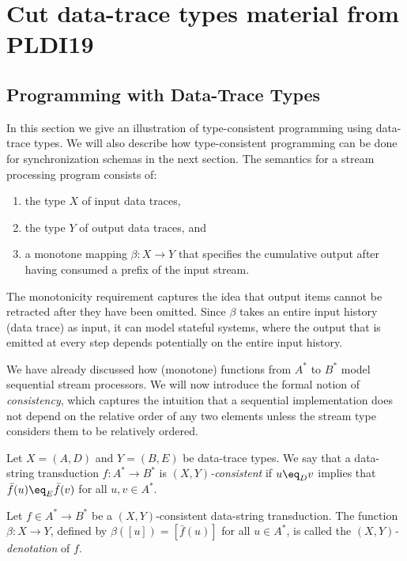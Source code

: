 \chapter{Cut data-trace types material from PLDI19}

\section{Programming with Data-Trace Types}
\label{subsec:dtt-2}

In this section we give an illustration of type-consistent programming
using data-trace types.
We will also describe how type-consistent programming can be done for
synchronization schemas in the next section.
The semantics for a stream processing program consists of:
\begin{enumerate}
\item
the type $X$ of input data traces,
\item
the type $Y$ of output data traces, and
\item
a monotone mapping $\beta: X \to Y$ that specifies the cumulative output after having consumed a prefix of the input stream.
\end{enumerate}
The monotonicity requirement captures the idea that output items cannot be retracted after they have been omitted. Since $\beta$ takes an entire input history (data trace) as input, it can model stateful systems, where the output that is emitted at every step depends potentially on the entire input history.

We have already discussed how (monotone) functions from $A^*$ to $B^*$ model sequential stream processors. We will now introduce the formal notion of \emph{consistency}, which captures the intuition that a sequential implementation does not depend on the relative order of any two elements unless the stream type considers them to be relatively ordered.

\begin{definition}[Consistency]
Let $X = (A,D)$ and $Y = (B,E)$ be data-trace types. We say that a data-string transduction $f: A^* \to B^*$
is \emph{$(X,Y)$-consistent} if $u \eq_D v$ implies that $\bar{f}(u) \eq_{E} \bar{f}(v)$ for all $u, v \in A^*$.

Let $f \in A^* \to B^*$ be a $(X,Y)$-consistent data-string transduction. The function $\beta: X \to Y$, defined by
$\beta([u]) = [\bar f(u)]$ for all $u \in A^*$, is called the \emph{$(X,Y)$-denotation} of $f$.
\end{definition}

